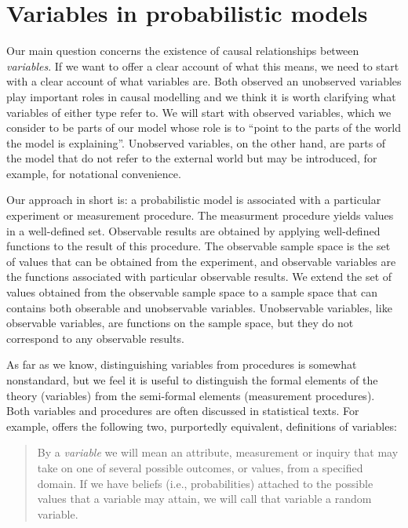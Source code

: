 

\section{Variables in probabilistic models}\label{sec:variables}

Our main question concerns the existence of causal relationships between \emph{variables}. If we want to offer a clear account of what this means, we need to start with a clear account of what variables are. Both observed an unobserved variables play important roles in causal modelling and we think it is worth clarifying what variables of either type refer to. We will start with observed variables, which we consider to be parts of our model whose role is to ``point to the parts of the world the model is explaining''. Unobserved variables, on the other hand, are parts of the model that do not refer to the external world but may be introduced, for example, for notational convenience.

Our approach in short is: a probabilistic model is associated with a particular experiment or measurement procedure. The measurment procedure yields values in a well-defined set. Observable results are obtained by applying well-defined functions to the result of this procedure. The observable sample space is the set of values that can be obtained from the experiment, and observable variables are the functions associated with particular observable results. We extend the set of values obtained from the observable sample space to a sample space that can contains both obserable and unobservable variables. Unobservable variables, like observable variables, are functions on the sample space, but they do not correspond to any observable results.

As far as we know, distinguishing variables from procedures is somewhat nonstandard, but we feel it is useful to distinguish the formal elements of the theory (variables) from the semi-formal elements (measurement procedures). Both variables and procedures are often discussed in statistical texts. For example, \citet{pearl_causality:_2009} offers the following two, purportedly equivalent, definitions of variables:
\begin{quote}
By a \emph{variable} we will mean an attribute, measurement or inquiry that may take on one of several possible outcomes, or values, from a specified domain. If we have beliefs (i.e., probabilities) attached to the possible values that a variable may attain, we will call that variable a random variable.
\end{quote}

